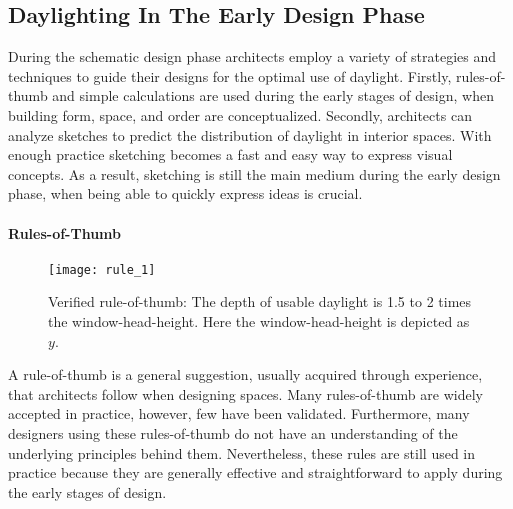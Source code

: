   \subsection{Daylighting In The Early Design Phase}
  During the schematic design phase architects employ a variety of strategies and techniques to guide their designs for the optimal use of daylight.
  Firstly, rules-of-thumb and simple calculations are used during the early stages of design, when building form, space, and order are conceptualized.
  Secondly, architects can analyze sketches to predict the distribution of daylight in interior spaces.
  With enough practice sketching becomes a fast and easy way to express visual concepts.
  As a result, sketching is still the main medium during the early design phase, when being able to quickly express ideas is crucial.
  \\

  \paragraph{Rules-of-Thumb}

  \begin{figure}[h]
  \centering
  \caption[Example of a common rule-of-thumb for daylighting.]{Verified rule-of-thumb: The depth of usable daylight is 1.5 to 2 times the window-head-height. Here the window-head-height is depicted as $y$.}
  \label{fig:daylightzone}
  \texttt{[image: rule\_1]}
  \end{figure}

  A rule-of-thumb is a general suggestion, usually acquired through experience, that architects follow when designing spaces. 
  Many rules-of-thumb are widely accepted in practice, however, few have been validated\cite{reinhart2005simulation}.
  Furthermore, many designers using these rules-of-thumb do not have an understanding of the underlying principles behind them\cite{Galasiu}.
  Nevertheless, these rules are still used in practice because they are generally effective and straightforward to apply during the early stages of design.
  \\

